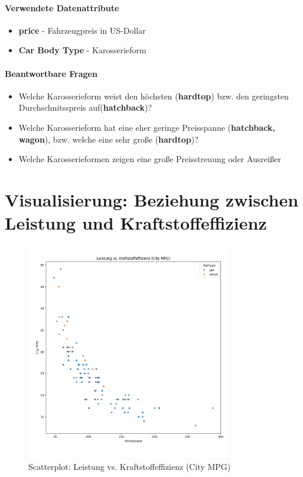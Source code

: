 \documentclass[a4paper,12pt]{article}
\begin{document}
\paragraph{Verwendete Datenattribute}
\begin{itemize}
  \item \textbf{price} - Fahrzeugpreis in US-Dollar
  \item \textbf{Car Body Type} - Karosserieform 
\end{itemize}

\hfill \break

\paragraph{Beantwortbare Fragen}
\begin{itemize}
  \item Welche Karosserieform weist den höchsten (\textbf{hardtop}) bzw. den geringsten Durchschnitsspreis auf(\textbf{hatchback})?
  \item Welche Karosserieform hat eine eher geringe Preisspanne (\textbf{hatchback, wagon}), bzw. welche eine sehr große (\textbf{hardtop})?
  \item Welche Karosserieformen zeigen eine große Preisstreuung oder Ausreißer
\end{itemize}

\section{Visualisierung: Beziehung zwischen Leistung und Kraftstoffeffizienz}
\begin{figure}[H]
    \centering
    \includegraphics[width=0.8\textwidth]{../images/leistung_vs_kraftstoffeffizienz.png} %
    \caption{Scatterplot: Leistung vs. Kraftstoffeffizienz (City MPG)}
    \label{fig:vis2}
\end{figure}
\end{document}
